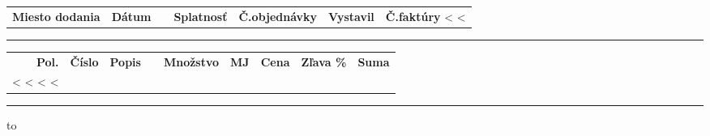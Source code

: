 \documentclass[twoside]{article}
\begin{document}
{\begin{tabularx}{\textwidth}
\hspace{-3mm}
\begin{tabularx}{\textwidth}{>{\hsize=2.1cm\centering}X@{\ }
                             >{\hsize=2.8cm\centering}X@{\ }
                             >{\hsize=2.8cm\centering}X@{\ }
                             >{\hsize=2.8cm\centering}X@{\ }
                             >{\hsize=3.4cm\centering}X@{\ }
                             >{\hsize=2.5cm\centering}X@{\ }
                             >{\hsize=2.0cm\raggedleft}X@{}}
  \textbf{Miesto dodania} & \textbf{Dátum} & \textbf{ } &
  \textbf{Splatnosť} & \textbf{Č.objednávky} & \textbf{Vystavil} & \textbf{Č.faktúry} 
  \cr
  <%
  <%
\end{tabularx}


\vspace{5mm}

\rule{\textwidth}{1.5pt}

\vspace{3mm}

\hspace{-3mm}
{\scriptsize

\begin{tabularx}{\textwidth}{@{}rlXlrlrrr@{}}
  \textbf{Pol.} & \textbf{Číslo} & \textbf{Popis} & & \textbf{Množstvo} &
    \textbf{MJ} & \textbf{Cena} & \textbf{Zľava \%} & \textbf{Suma} \\ [0.5em]
<%
  <%
  <%
<%
\end{tabularx}


\rule{\textwidth}{1.5pt}

\hbox to}
\end{tabularx}}
\end{document}
